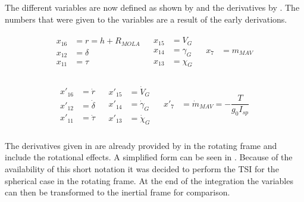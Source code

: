 \noindent
The different variables are now defined as shown by  and the derivatives by . The numbers that were given to the variables are a result of the early derivations.

\begin{align} \label{eq:spherVar}
\begin{split}
x_{16} &= r = h+R_{MOLA} \\
x_{12} &= \delta \\
x_{11} &= \tau \\
\end{split}
&
\begin{split}
x_{15} &= V_{G} \\
x_{14} &= \gamma_{G} \\
x_{13} &= \chi_{G} \\
\end{split}
&
\begin{split}
x_{7} &= m_{MAV} \\
\end{split}
\end{align}

\begin{align} \label{eq:spherVarD}
\begin{split}
x'_{16} &= \dot{r} \\
x'_{12} &= \dot{\delta} \\
x'_{11} &= \dot{\tau} \\
\end{split}
&
\begin{split}
x'_{15} &= \dot{V}_{G} \\
x'_{14} &= \dot{\gamma}_{G} \\
x'_{13} &= \dot{\chi}_{G} \\
\end{split}
&
\begin{split}
x'_{7} &= \dot{m}_{MAV} = -\dfrac{T}{g_{0}I_{sp}} \\
\end{split}
\end{align}

\noindent
The derivatives given in  are already provided by \cite{mooij1994motion} in the rotating frame and include the rotational effects. A simplified form can be seen in . Because of the availability of this short notation it was decided to perform the \ac{TSI} for the spherical case in the rotating frame. At the end of the integration the variables can then be transformed to the inertial frame for comparison.

